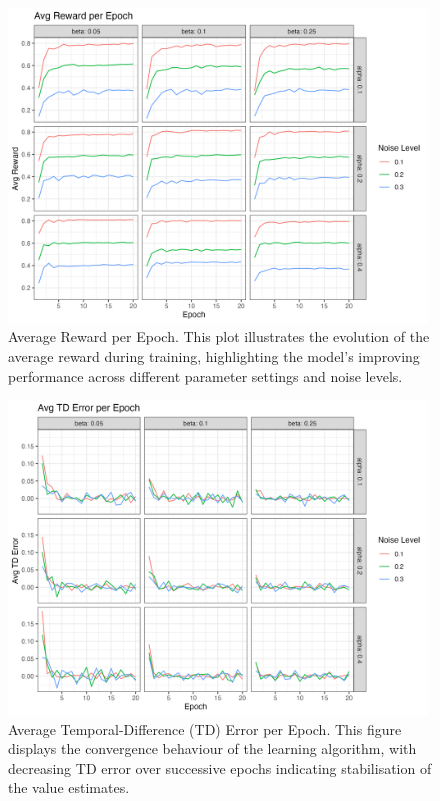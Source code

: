 \begin{figure}[h]
    \centering
    \includegraphics[width=0.99\textwidth]{../figures/epoch_reward.png}
    \caption{Average Reward per Epoch. This plot illustrates the evolution of the average reward during training, highlighting the model's improving performance across different parameter settings and noise levels.}
    \label{fig:epoch_reward}
\end{figure}

\begin{figure}[h]
    \centering
    \includegraphics[width=0.99\textwidth]{../figures/epoch_td.png}
    \caption{Average Temporal-Difference (TD) Error per Epoch. This figure displays the convergence behaviour of the learning algorithm, with decreasing TD error over successive epochs indicating stabilisation of the value estimates.}
    \label{fig:epoch_td}
\end{figure}

